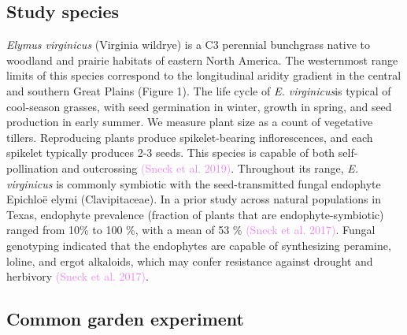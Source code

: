 \documentclass[11pt]{article}
\begin{document}
\subsection*{Study species}
\emph {Elymus virginicus} (Virginia wildrye) is a C3 perennial bunchgrass native to woodland and prairie habitats of eastern North America. 
The westernmost range limits of this species correspond to the longitudinal aridity gradient in the central and southern Great Plains (Figure 1). 
The life cycle of \emph{E. virginicus}is typical of cool-season grasses, with seed germination in winter, growth in spring, and seed production in early summer. 
We measure plant size as a count of vegetative tillers. Reproducing plants produce spikelet-bearing inflorescences, and each spikelet typically produces 2-3 seeds. 
This species is capable of both self-pollination and outcrossing \textcolor{violet}{(Sneck et al. 2019)}. 
Throughout its range, \emph {E. virginicus} is commonly symbiotic with the seed-transmitted fungal endophyte Epichloë elymi (Clavipitaceae). 
In a prior study across natural populations in Texas, endophyte prevalence (fraction of plants that are endophyte-symbiotic) ranged from 10\% to 100 \%, with a mean of 53 \% \textcolor{violet}{(Sneck et al. 2017)}. 
Fungal genotyping indicated that the endophytes are capable of synthesizing peramine, loline, and ergot alkaloids, which may confer resistance against drought and herbivory \textcolor{violet}{(Sneck et al. 2017)}.

\subsection*{Common garden experiment}
\end{document}
